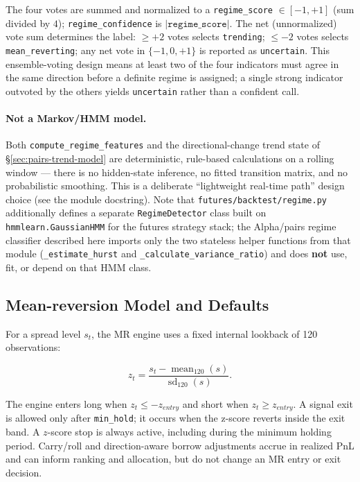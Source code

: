 The four votes are summed and normalized to a \texttt{regime\_score} $\in [-1, +1]$ (sum
divided by $4$); \texttt{regime\_confidence} is $\left|\texttt{regime\_score}\right|$. The
net (unnormalized) vote sum determines the label: $\ge +2$ votes selects
\texttt{trending}; $\le -2$ votes selects \texttt{mean\_reverting}; any net vote in
$\{-1, 0, +1\}$ is reported as \texttt{uncertain}. This ensemble-voting design means at
least two of the four indicators must agree in the same direction before a definite
regime is assigned; a single strong indicator outvoted by the others yields
\texttt{uncertain} rather than a confident call.

\paragraph{Not a Markov/HMM model.} Both \texttt{compute\_regime\_features} and the
directional-change trend state of \S\ref{sec:pairs-trend-model} are deterministic,
rule-based calculations on a rolling window --- there is no hidden-state inference, no
fitted transition matrix, and no probabilistic smoothing. This is a deliberate
``lightweight real-time path'' design choice (see the module docstring). Note that
\texttt{futures/backtest/regime.py} additionally defines a separate
\texttt{RegimeDetector} class built on \texttt{hmmlearn.GaussianHMM} for the futures
strategy stack; the Alpha/pairs regime classifier described here imports only the two
stateless helper functions from that module (\texttt{\_estimate\_hurst} and
\texttt{\_calculate\_variance\_ratio}) and does \textbf{not} use, fit, or depend on that
HMM class.

\subsection{Mean-reversion Model and Defaults}

For a spread level $s_t$, the MR engine uses a fixed internal lookback of 120
observations:

\begin{equation}
z_t = \frac{s_t - \operatorname{mean}_{120}(s)}{\operatorname{sd}_{120}(s)}.
\end{equation}

The engine enters long when $z_t \le -z_{entry}$ and short when
$z_t \ge z_{entry}$. A signal exit is allowed only after \texttt{min\_hold}; it occurs
when the z-score reverts inside the exit band. A $z$-score stop is always active,
including during the minimum holding period. Carry/roll and direction-aware borrow
adjustments accrue in realized PnL and can inform ranking and allocation, but do not
change an MR entry or exit decision.

